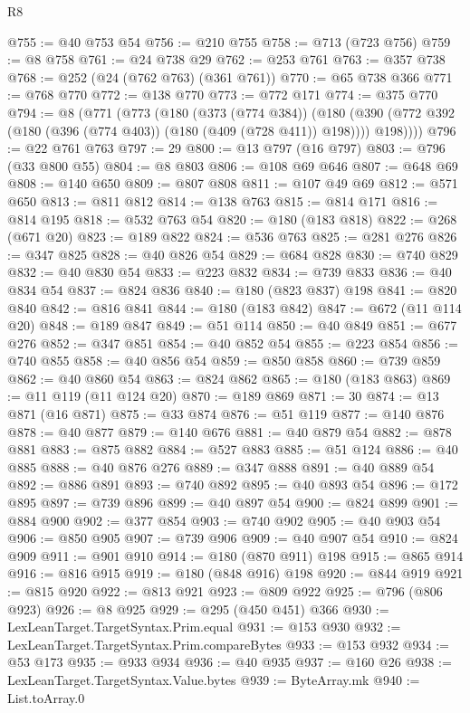\begin{lexlean}{R8}
\begin{coremodule}
@755 := @40 @753 @54
@756 := @210 @755
@758 := @713 (@723 @756)
@759 := @8 @758
@761 := @24 @738 @29
@762 := @253 @761
@763 := @357 @738
@768 := @252 (@24 (@762 @763) (@361 @761))
@770 := @65 @738 @366
@771 := @768 @770
@772 := @138 @770
@773 := @772 @171
@774 := @375 @770
@794 := @8
    (@771
      (@773
        (@180
          (@373 (@774 @384))
          (@180 (@390 (@772 @392 (@180 (@396 (@774 @403)) (@180 (@409 (@728 @411)) @198)))) @198))))
@796 := @22 @761 @763
@797 := 29
@800 := @13 @797 (@16 @797)
@803 := @796 (@33 @800 @55)
@804 := @8 @803
@806 := @108 @69 @646
@807 := @648 @69
@808 := @140 @650
@809 := @807 @808
@811 := @107 @49 @69
@812 := @571 @650
@813 := @811 @812
@814 := @138 @763
@815 := @814 @171
@816 := @814 @195
@818 := @532 @763 @54
@820 := @180 (@183 @818)
@822 := @268 (@671 @20)
@823 := @189 @822
@824 := @536 @763
@825 := @281 @276
@826 := @347 @825
@828 := @40 @826 @54
@829 := @684 @828
@830 := @740 @829
@832 := @40 @830 @54
@833 := @223 @832
@834 := @739 @833
@836 := @40 @834 @54
@837 := @824 @836
@840 := @180 (@823 @837) @198
@841 := @820 @840
@842 := @816 @841
@844 := @180 (@183 @842)
@847 := @672 (@11 @114 @20)
@848 := @189 @847
@849 := @51 @114
@850 := @40 @849
@851 := @677 @276
@852 := @347 @851
@854 := @40 @852 @54
@855 := @223 @854
@856 := @740 @855
@858 := @40 @856 @54
@859 := @850 @858
@860 := @739 @859
@862 := @40 @860 @54
@863 := @824 @862
@865 := @180 (@183 @863)
@869 := @11 @119 (@11 @124 @20)
@870 := @189 @869
@871 := 30
@874 := @13 @871 (@16 @871)
@875 := @33 @874
@876 := @51 @119
@877 := @140 @876
@878 := @40 @877
@879 := @140 @676
@881 := @40 @879 @54
@882 := @878 @881
@883 := @875 @882
@884 := @527 @883
@885 := @51 @124
@886 := @40 @885
@888 := @40 @876 @276
@889 := @347 @888
@891 := @40 @889 @54
@892 := @886 @891
@893 := @740 @892
@895 := @40 @893 @54
@896 := @172 @895
@897 := @739 @896
@899 := @40 @897 @54
@900 := @824 @899
@901 := @884 @900
@902 := @377 @854
@903 := @740 @902
@905 := @40 @903 @54
@906 := @850 @905
@907 := @739 @906
@909 := @40 @907 @54
@910 := @824 @909
@911 := @901 @910
@914 := @180 (@870 @911) @198
@915 := @865 @914
@916 := @816 @915
@919 := @180 (@848 @916) @198
@920 := @844 @919
@921 := @815 @920
@922 := @813 @921
@923 := @809 @922
@925 := @796 (@806 @923)
@926 := @8 @925
@929 := @295 (@450 @451) @366
@930 := LexLeanTarget.TargetSyntax.Prim.equal
@931 := @153 @930
@932 := LexLeanTarget.TargetSyntax.Prim.compareBytes
@933 := @153 @932
@934 := @53 @173
@935 := @933 @934
@936 := @40 @935
@937 := @160 @26
@938 := LexLeanTarget.TargetSyntax.Value.bytes
@939 := ByteArray.mk
@940 := List.toArray.{0}

\end{coremodule}
\end{lexlean}
